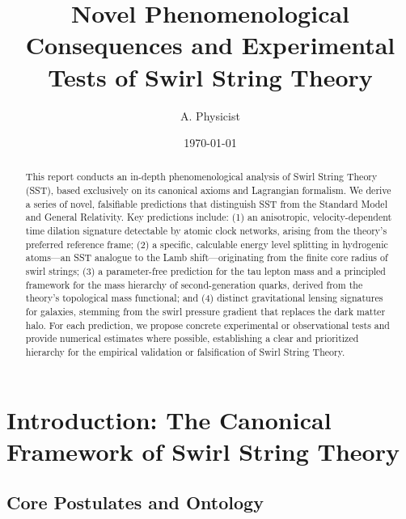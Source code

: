 \documentclass[11pt, a4paper]{article}
\title{Novel Phenomenological Consequences and Experimental Tests of Swirl String Theory}
\author{A. Physicist}
\date{\today}
\begin{document}
\maketitle

\begin{abstract}
This report conducts an in-depth phenomenological analysis of Swirl String Theory (SST), based exclusively on its canonical axioms and Lagrangian formalism. We derive a series of novel, falsifiable predictions that distinguish SST from the Standard Model and General Relativity. Key predictions include: (1) an anisotropic, velocity-dependent time dilation signature detectable by atomic clock networks, arising from the theory's preferred reference frame; (2) a specific, calculable energy level splitting in hydrogenic atoms---an SST analogue to the Lamb shift---originating from the finite core radius of swirl strings; (3) a parameter-free prediction for the tau lepton mass and a principled framework for the mass hierarchy of second-generation quarks, derived from the theory's topological mass functional; and (4) distinct gravitational lensing signatures for galaxies, stemming from the swirl pressure gradient that replaces the dark matter halo. For each prediction, we propose concrete experimental or observational tests and provide numerical estimates where possible, establishing a clear and prioritized hierarchy for the empirical validation or falsification of Swirl String Theory.
\end{abstract}

\section{Introduction: The Canonical Framework of Swirl String Theory}

    \subsection{Core Postulates and Ontology}
\end{document}
